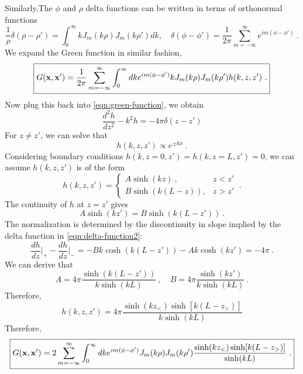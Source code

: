 \documentclass[12pt]{article}
\newcommand{\x}{{\bf x}}
\begin{document}
\newpage
{} Similarly,The $\phi$ and $\rho$ delta functions can be written in terms of orthonormal functions
\begin{equation}
    \frac{1}{\rho}\delta(\rho - \rho') = \int_0^\infty k J_m(k\rho) J_m(k \rho') dk, \quad \delta(\phi - \phi') = \frac{1}{2\pi} \sum_{m = -\infty}^\infty e^{im(\phi-\phi')}~.
\end{equation}
We expand the Green function in similar fashion,
\begin{equation}
    \boxed{
    G(\x, \x') = \frac{1}{2\pi}  \sum_{m = - \infty}^\infty \int_0^\infty dk e^{im(\phi - \phi')} k J_m(k \rho) J_m(k \rho') h(k,z,z')~.
    }
\end{equation}
Now plug this back into \eqref{eqn:green-function}, we obtain
\begin{equation}\label{eqn:delta-function2}
    \frac{d^2 h}{dz^2} - k^2 h = -4\pi \delta(z-z')
\end{equation}
For $z \neq z'$, we can solve that
\begin{equation}
    h(k, z, z') \propto e^{\pm k x}~.
\end{equation}
Considering boundary conditions $h(k,z=0,z') = h(k, z=L, z') = 0$, we can assume $h(k,z,z')$ is of the form
\begin{equation}
    h(k,z,z') = \begin{cases}
        A \sinh (kz)~, &  z < z'\\
        B \sinh(k(L-z)), & z > z'
    \end{cases}~.
\end{equation}
The continuity of $h$ at $z= z'$ gives
\begin{equation}
    A \sinh(kz') = B \sinh(k(L-z'))~.
\end{equation}
The normalization is determined by the discontinuity in slope implied by the delta function in \eqref{eqn:delta-function2}:
\begin{equation}\label{eqn:discontinuioty2}
    \frac{d h}{d z}\Bigg|_+ - \frac{d h}{dz}\Bigg|_- = -Bk\cosh(k(L-z')) - Ak \cosh(kz') = -4\pi~.
\end{equation}
We can derive that
\begin{equation}
    A= 4\pi\frac{\sinh(k(L-z'))}{k \sinh(kL)}~, \quad B = 4\pi\frac{\sinh(kz')}{k \sinh(kL)}~.
\end{equation}
Therefore,
\begin{equation}
\boxed{
    h(k,z,z') = 4\pi \frac{\sinh(k z_<) \sinh[k(L-z_>)]}{k \sinh(kL)}
}
\end{equation}
Therefore,
\begin{equation}
    \boxed{
    G(\x, \x') = 2  \sum_{m = - \infty}^\infty \int_0^\infty dk e^{im(\phi - \phi')} J_m(k \rho) J_m(k \rho') \frac{\sinh(k z_<) \sinh[k(L-z_>)]}{ \sinh(kL)}~.
    }
\end{equation}
\end{document}
